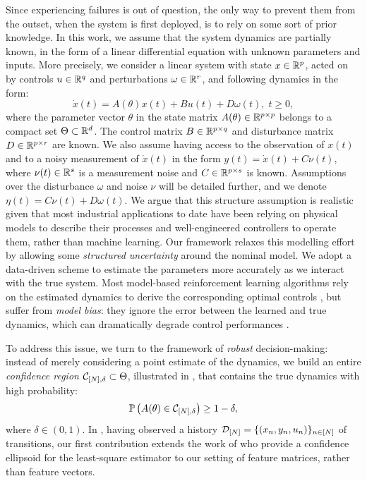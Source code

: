 \documentclass{article}
\begin{document}
Since experiencing failures is out of question, the only way to prevent them from the outset, when the system is first deployed, is to rely on some sort of prior knowledge. In this work, we assume that the system dynamics are partially known, in the form of a linear differential equation with unknown parameters and inputs. More precisely, we consider a linear system with state $x\in\mathbb{R}^p$, acted on by controls $u\in\mathbb{R}^q$ and perturbations $\omega\in\mathbb{R}^r$, and following dynamics in the form:
\begin{equation}
\label{eq:dynamics}
\dot{x}(t)=A(\theta)x(t) + B u(t) + D \omega(t),\;t\geq0,
\end{equation}
where the parameter vector $\theta$ in the state matrix $A(\theta)\in\mathbb{R}^{p\times p}$ belongs to a compact set $\Theta \subset \mathbb{R}^d$. The control matrix $B\in\mathbb{R}^{p\times q}$ and disturbance matrix $D\in\mathbb{R}^{p\times r}$ are known. We also assume having access to the observation of $x(t)$ and to a noisy measurement of $\dot{x}(t)$ in the form $y(t)=\dot{x}(t) + C\nu(t)$, where $\nu(t)\in\mathbb{R}^s$ is a measurement noise and $C\in\mathbb{R}^{p\times s}$ is known. Assumptions over the disturbance $\omega$ and noise $\nu$ will be detailed further, and we denote $\eta(t) = C\nu(t) + D\omega(t)$. We argue that this structure assumption is realistic given that most industrial applications to date have been relying on physical models to describe their processes and well-engineered controllers to operate them, rather than machine learning. Our framework relaxes this modelling effort by allowing some \emph{structured uncertainty} around the nominal model. We adopt a data-driven scheme to estimate the parameters more accurately as we interact with the true system. Most model-based reinforcement learning algorithms rely on the estimated dynamics to derive the corresponding optimal controls \citep[e.g.][]{Lenz2015,Levine2015}, but suffer from \emph{model bias}: they ignore the error between the learned and true dynamics, which can dramatically degrade control performances \citep{Schneider1997}. %

To address this issue, we turn to the framework of \emph{robust} decision-making: instead of merely considering a point estimate of the dynamics, we build an entire \emph{confidence region} $\mathcal{C}_{[N],\delta} \subset \Theta$, illustrated in , that contains the true dynamics with high probability:
\begin{align}
\mathbb{P}\left(A(\theta)\in \mathcal{C}_{[N],\delta}\right) \geq 1-\delta,
\label{eq:confidence}
\end{align}
where $\delta\in(0,1)$. In , having observed a history $\mathcal{D}_{[N]} = \{(x_n, y_n,u_n)\}_{n\in[N]}$ of transitions, our first contribution extends the work of \citet{Abbasi2011} who provide a confidence ellipsoid for the least-square estimator to our setting of feature matrices, rather than feature vectors. 
\end{document}
